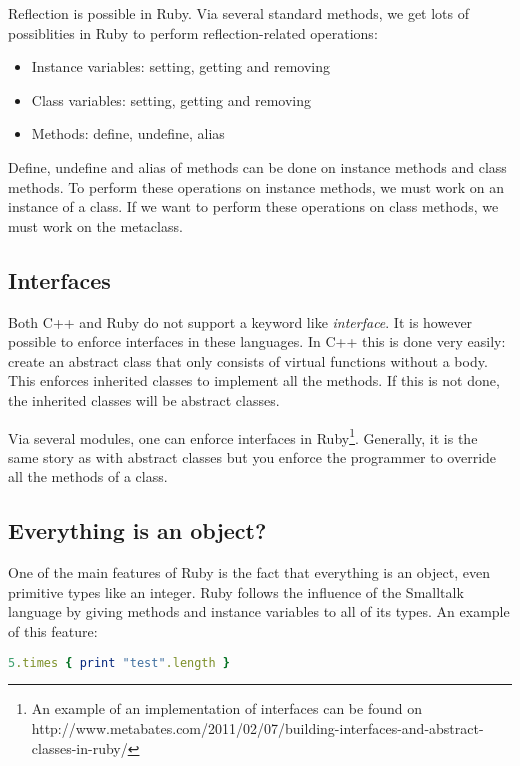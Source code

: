 \documentclass[10pt,a4paper,twocolumn]{article}
\begin{document}
Reflection is possible in Ruby. Via several standard methods, we get lots of possiblities in Ruby to perform reflection-related operations:

\begin{itemize}
\item Instance variables: setting, getting and removing
\item Class variables: setting, getting and removing
\item Methods: define, undefine, alias
\end{itemize}

Define, undefine and alias of methods can be done on instance methods and class methods. To perform these operations on instance methods, we must work on an instance of a class. If we want to perform these operations on class methods, we must work on the metaclass.

\subsection{Interfaces}

Both C++ and Ruby do not support a keyword like \textit{interface}. It is however possible to enforce interfaces in these languages. In C++ this is done very easily: create an abstract class that only consists of virtual functions without a body. This enforces inherited classes to implement all the methods. If this is not done, the inherited classes will be abstract classes.

Via several modules, one can enforce interfaces in Ruby\footnote{An example of an implementation of interfaces can be found on http://www.metabates.com/2011/02/07/building-interfaces-and-abstract-classes-in-ruby/}. Generally, it is the same story as with abstract classes but you enforce the programmer to override all the methods of a class.

\subsection{Everything is an object?}

One of the main features of Ruby is the fact that everything is an object, even primitive types like an integer. Ruby follows the influence of the Smalltalk language by giving methods and instance variables to all of its types. An example of this feature:

\begin{lstlisting}[language=Ruby]
5.times { print "test".length }
\end{lstlisting}
\end{document}
